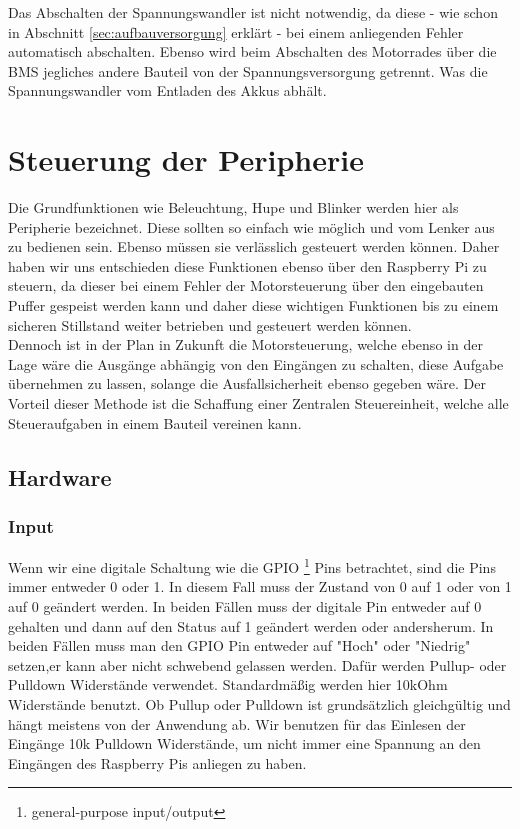 Das Abschalten der Spannungswandler ist nicht notwendig, da diese - wie schon in Abschnitt \ref{sec:aufbauversorgung} erklärt - bei einem anliegenden Fehler automatisch abschalten.
Ebenso wird beim Abschalten des Motorrades über die BMS jegliches andere Bauteil von der Spannungsversorgung getrennt. Was die Spannungswandler vom Entladen des Akkus abhält.  

\newpage


\section{Steuerung der Peripherie}

Die Grundfunktionen wie Beleuchtung, Hupe und Blinker werden hier als Peripherie bezeichnet. Diese sollten so einfach wie möglich und vom Lenker aus zu bedienen sein. Ebenso müssen sie verlässlich gesteuert werden können. Daher haben wir uns entschieden diese Funktionen ebenso über den Raspberry Pi zu steuern, da dieser bei einem Fehler der Motorsteuerung über den eingebauten Puffer gespeist werden kann und daher diese wichtigen Funktionen bis zu einem sicheren Stillstand weiter betrieben und gesteuert werden können.\\


Dennoch ist in der Plan in Zukunft die Motorsteuerung, welche ebenso in der Lage wäre die Ausgänge abhängig von den Eingängen zu schalten, diese Aufgabe übernehmen zu lassen, solange die Ausfallsicherheit ebenso gegeben wäre. Der Vorteil dieser Methode ist die Schaffung einer Zentralen Steuereinheit, welche alle Steueraufgaben in einem Bauteil vereinen kann.

\subsection{Hardware}

\subsubsection{Input}
Wenn wir eine digitale Schaltung wie die GPIO \footnote{general-purpose input/output} Pins betrachtet, sind die Pins immer entweder 0 oder 1. In diesem Fall muss der Zustand von 0 auf 1 oder von 1 auf 0 geändert werden. In beiden Fällen muss der digitale Pin entweder auf 0 gehalten und dann auf den Status auf 1 geändert werden oder andersherum. In beiden Fällen muss man den GPIO Pin entweder auf "Hoch" oder "Niedrig" setzen,er kann aber nicht schwebend gelassen werden. Dafür werden Pullup- oder Pulldown Widerstände verwendet. Standardmäßig werden hier 10kOhm Widerstände benutzt. Ob Pullup oder Pulldown ist grundsätzlich gleichgültig und hängt meistens von der Anwendung ab. Wir benutzen für das Einlesen der Eingänge 10k Pulldown Widerstände, um nicht immer eine Spannung an den Eingängen des Raspberry Pis anliegen zu haben.

